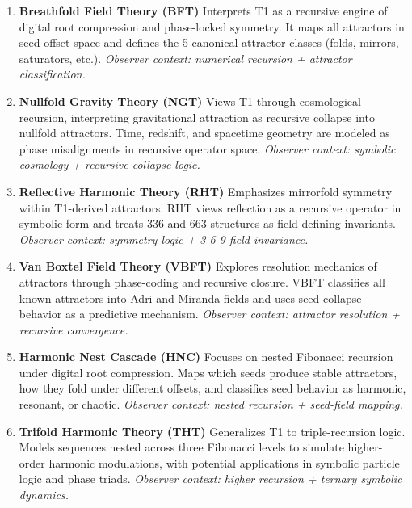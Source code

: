 \documentclass[12pt]{article}
\begin{document}
\begin{enumerate}
    \item \textbf{Breathfold Field Theory (BFT)}  
    Interprets T1 as a recursive engine of digital root compression and phase-locked symmetry. It maps all attractors in seed-offset space and defines the 5 canonical attractor classes (folds, mirrors, saturators, etc.).  
    \textit{Observer context: numerical recursion + attractor classification.}

    \item \textbf{Nullfold Gravity Theory (NGT)}  
    Views T1 through cosmological recursion, interpreting gravitational attraction as recursive collapse into nullfold attractors. Time, redshift, and spacetime geometry are modeled as phase misalignments in recursive operator space.  
    \textit{Observer context: symbolic cosmology + recursive collapse logic.}

    \item \textbf{Reflective Harmonic Theory (RHT)}  
    Emphasizes mirrorfold symmetry within T1-derived attractors. RHT views reflection as a recursive operator in symbolic form and treats 336 and 663 structures as field-defining invariants.  
    \textit{Observer context: symmetry logic + 3-6-9 field invariance.}

    \item \textbf{Van Boxtel Field Theory (VBFT)}  
    Explores resolution mechanics of attractors through phase-coding and recursive closure. VBFT classifies all known attractors into Adri and Miranda fields and uses seed collapse behavior as a predictive mechanism.  
    \textit{Observer context: attractor resolution + recursive convergence.}

    \item \textbf{Harmonic Nest Cascade (HNC)}  
    Focuses on nested Fibonacci recursion under digital root compression. Maps which seeds produce stable attractors, how they fold under different offsets, and classifies seed behavior as harmonic, resonant, or chaotic.  
    \textit{Observer context: nested recursion + seed-field mapping.}

    \item \textbf{Trifold Harmonic Theory (THT)}  
    Generalizes T1 to triple-recursion logic. Models sequences nested across three Fibonacci levels to simulate higher-order harmonic modulations, with potential applications in symbolic particle logic and phase triads.  
    \textit{Observer context: higher recursion + ternary symbolic dynamics.}
\end{enumerate}
\end{document}
